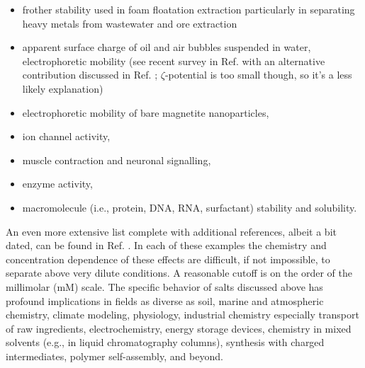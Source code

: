 \begin{intro}
\begin{itemize}
        \item frother stability used in foam floatation extraction particularly in separating heavy metals from wastewater and ore extraction\cite{ozdemir2013specific}
        \item apparent surface charge of oil and air bubbles suspended in water, electrophoretic mobility (see recent survey in Ref. \cite{zimmermann2010hydroxide} with an alternative
        contribution discussed in Ref. \cite{rick2012bubbles}; $\zeta$-potential is too small though, so it's a less likely explanation)
        \item electrophoretic mobility of bare magnetite nanoparticles\cite{vereda2015specific},
        \item ion channel activity\cite{asthagiri2010ion,chen2016free,dreyer2013role,guidoni1999potassium,guidoni2000water,guidoni2002tetraethylammonium,liu2013equilibrium,roux2011ion,zhang2012water},
        \item muscle contraction and neuronal signalling\cite{purves2001neuroscience,szent1975calcium},
        \item enzyme activity\cite{cacace1997hofmeister},
        \item macromolecule (i.e., protein, DNA, RNA, surfactant) stability and
        solubility\cite{abernethy1967franz,cacace1997hofmeister,collins1995,collins2004ions,collins2007review,kunz2004translation,kunz2010book,marcus2009effect}.
    \end{itemize}
    
    An even more extensive list complete with additional references, albeit a bit dated, can be found in Ref. \cite{collins1985hofmeister}. In each of these examples 
    the chemistry and concentration dependence of these effects are difficult, if not impossible, to separate above very dilute conditions. A reasonable cutoff is on the order
    of the millimolar (mM) scale. The specific behavior of salts discussed above has profound implications in fields as diverse as soil\cite{yu2016soil},
    marine\cite{jungwirth2006airwat} and 
    atmospheric\cite{baer2014investigation,buch2007surfacid,galib2014oceanacid,galib2014hbondingcarbonic,jungwirth2002airwat,jungwirth2006airwat,lewis2011does} chemistry, 
    climate modeling, physiology, industrial chemistry especially transport of raw ingredients\cite{hodson2013personal}, electrochemistry, energy storage devices\cite{ayse2016ecpc},
    chemistry in mixed solvents (e.g., in liquid chromatography columns)\cite{suu2015mixedpH}, synthesis with charged intermediates, polymer self-assembly\cite{roy2012dramatic}, and 
    beyond. 
    

\end{intro}
